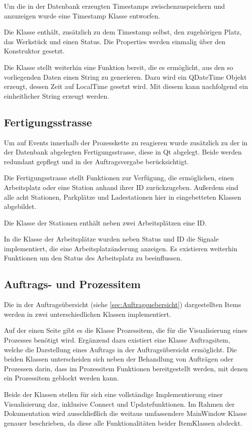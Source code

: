 Um die in der Datenbank erzeugten Timestamps zwischenzuspeichern und anzuzeigen wurde eine Timestamp Klasse entworfen. 

Die Klasse enthält, zusätzlich zu dem Timestamp selbst, den zugehörigen Platz, das Werkstück und einen Status. Die Properties werden einmalig über den Konstruktor gesetzt. 

Die Klasse stellt weiterhin eine Funktion bereit, die es ermöglicht, aus den so vorliegenden Daten einen String zu generieren. Dazu wird ein QDateTime Objekt erzeugt, dessen Zeit auf LocalTime gesetzt wird. Mit diesem kann nachfolgend ein einheitlicher String erzeugt werden. 

\subsection{Fertigungsstrasse}

Um auf Events innerhalb der Prozesskette zu reagieren wurde zusätzlich zu der in der Datenbank abgelegten Fertigungsstrasse, diese in Qt abgelegt. Beide werden redundant gepflegt und in der Auftragsvergabe berücksichtigt. 

Die Fertigungsstrasse stellt Funktionen zur Verfügung, die ermöglichen, einen Arbeitsplatz oder eine Station anhand ihrer ID zurückzugeben. Außerdem sind alle acht Stationen, Parkplätze und Ladestationen hier in eingebetteten Klassen abgebildet. 

Die Klasse der Stationen enthält neben zwei Arbeitsplätzen eine ID. 

In die Klasse der Arbeitsplätze wurden neben Status und ID die Signale implementiert, die eine Arbeitsplatzänderung anzeigen. Es existieren weiterhin Funktionen um den Status des Arbeitsplatz zu beeinflussen. 

\subsection{Auftrags- und Prozessitem}
\label{sec:Auftragsitem}

Die in der Auftragsübersicht (siehe \ref{sec:Auftragsuebersicht}) dargestellten Items werden in zwei unterschiedlichen Klassen implementiert. 

Auf der einen Seite gibt es die Klasse Prozessitem, die für die Visualisierung eines Prozesses benötigt wird. Ergänzend dazu existiert eine Klasse Auftragsitem, welche die Darstellung eines Auftrags in der Auftragsübersicht ermöglicht. Die beiden Klassen unterscheiden sich neben der Behandlung von Aufträgen oder Prozessen darin, dass im Prozessitem Funktionen bereitgestellt werden, mit denen ein Prozessitem geblockt werden kann.

Beide der Klassen stellen für sich eine vollständige Implementierung einer Visualisierung dar, inklusive Connect und Updatefunktionen. Im Rahmen der Dokumentation wird ausschließlich die weitaus umfassendere MainWindow Klasse genauer beschrieben, da diese alle Funktionalitäten beider ItemKlassen abdeckt. 

